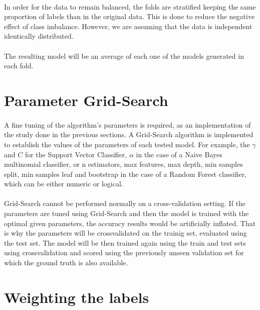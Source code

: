 \documentclass[12pt,a4paper]{report}
\begin{document}
\paragraph{} In order for the data to remain balanced, the folds are stratified keeping the same proportion of labels than in the original data. This is done to reduce the negative effect of class imbalance. However, we are assuming that the data is independent identically distributed.

\paragraph{} The resulting model will be an average of each one of the models generated in each fold.

\section{Parameter Grid-Search}

\paragraph{} A fine tuning of the algorithm's parameters is required, as an implementation of the study done in the previous sections. A Grid-Search algorithm is implemented to establish the values of the parameters of each tested model. For example, the $\gamma$ and $C$ for the Support Vector Classifier, $\alpha$ in the case of a Naive Bayes multinomial classifier, or n estimators, max features, max depth, min samples split, min samples leaf and bootstrap in the case of a Random Forest classifier, which can be either numeric or logical.

\paragraph{} Grid-Search cannot be performed normally on a cross-validation setting. If the parameters are tuned using Grid-Search and then the model is trained with the optimal given parameters, the accuracy results would be artificially inflated. That is why the parameters will be crossvalidated on the trainig set, evaluated using the test set. The model will be then trained again using the train and test sets using crossvalidation and scored using the previously unseen  validation set for which the ground truth is also available.

\section{Weighting the labels}
\end{document}
